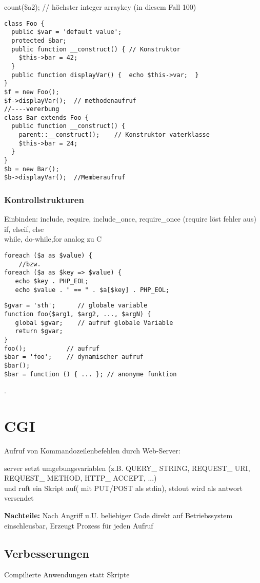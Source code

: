 count(\$a2); // höchster integer arraykey (in diesem Fall 100)
\begin{verbatim}
class Foo {
  public $var = 'default value';
  protected $bar;
  public function __construct() { // Konstruktor
    $this->bar = 42;
  }
  public function displayVar() {  echo $this->var;  }
}
$f = new Foo();
$f->displayVar();  // methodenaufruf
//----vererbung
class Bar extends Foo {
  public function __construct() {
    parent::__construct();    // Konstruktor vaterklasse
    $this->bar = 24;
  }
}
$b = new Bar();
$b->displayVar();  //Memberaufruf
\end{verbatim}\newpage

\subsubsection{Kontrollstrukturen}
Einbinden: include, require, include\_once, require\_once (require löst fehler aus)\\
if, elseif, else\\
while, do-while,for analog zu C
\begin{verbatim}
foreach ($a as $value) {
	//bzw.
foreach ($a as $key => $value) {
   echo $key . PHP_EOL;   
   echo $value . " == " . $a[$key] . PHP_EOL;
\end{verbatim}
\begin{verbatim}
$gvar = 'sth';      // globale variable
function foo($arg1, $arg2, ..., $argN) {
   global $gvar;    // aufruf globale Variable
   return $gvar;
}
foo();           // aufruf
$bar = 'foo';    // dynamischer aufruf
$bar();
$bar = function () { ... }; // anonyme funktion
\end{verbatim} \newpage 
.
\newpage
\section{CGI}
Aufruf von Kommandozeilenbefehlen durch Web-Server: 

server setzt umgebungsvariablen (z.B. QUERY\_ STRING, REQUEST\_ URI, REQUEST\_ METHOD, HTTP\_ ACCEPT, ...) \\ und ruft ein Skript auf( mit PUT/POST als stdin), stdout wird als antwort versendet

\textbf{Nachteile: }Nach Angriff u.U. beliebiger Code direkt auf Betriebssystem einschleusbar, Erzeugt Prozess für jeden Aufruf
\subsection{Verbesserungen}
Compilierte Anwendungen statt Skripte

